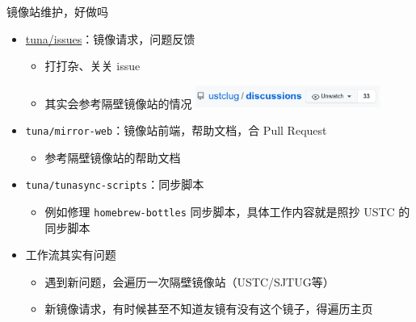 \documentclass{ctexbeamer}
\newcommand{\T}[1]{\texttt{#1}}
\begin{document}
\begin{frame}{镜像站维护，好做吗}
  \begin{itemize}
    \item \url{tuna/issues}：镜像请求，问题反馈\begin{itemize}
      \item 打打杂、关关 issue
      \item 其实会参考隔壁镜像站的情况
      \includegraphics[width=0.5\textwidth]{img/ustc-discuss.png}
    \end{itemize}
    \item \T{tuna/mirror-web}：镜像站前端，帮助文档，合 Pull Request\begin{itemize}
      \item 参考隔壁镜像站的帮助文档
    \end{itemize}
    \item \T{tuna/tunasync-scripts}：同步脚本\begin{itemize}
      \item 例如修理 \T{homebrew-bottles} 同步脚本，具体工作内容就是照抄 USTC 的同步脚本
    \end{itemize}
    \item 工作流其实有问题\begin{itemize}
      \item 遇到新问题，会遍历一次隔壁镜像站（USTC/SJTUG等）
      \item 新镜像请求，有时候甚至不知道友镜有没有这个镜子，得遍历主页
    \end{itemize}
  \end{itemize}
\end{frame}
\end{document}
